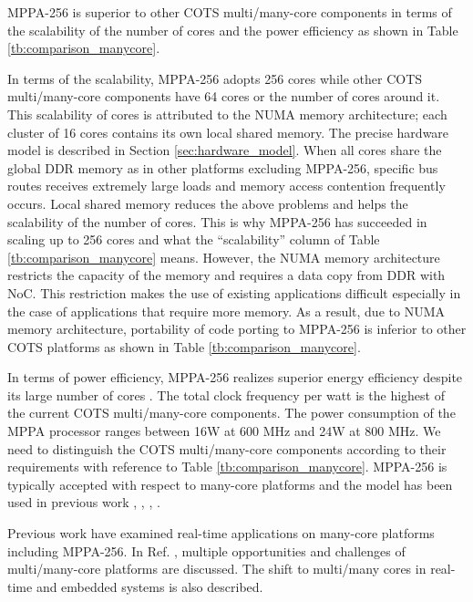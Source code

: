 \documentclass[conference,compsoc]{IEEEtran}
\newcommand{\comment}[1]{}
\begin{document}
\comment{1-27}
MPPA-256 is superior to other COTS multi/many-core components in terms of the scalability of the number of cores and the power efficiency as shown in Table \ref{tb:comparison_manycore}.
\comment{1-28}
In terms of the scalability, MPPA-256 adopts 256 cores while other COTS multi/many-core components have 64 cores or the number of cores around it.
This scalability of cores is attributed to the NUMA memory architecture; each cluster of 16 cores contains its own local shared memory.
The precise hardware model is described in Section \ref{sec:hardware_model}.
When all cores share the global DDR memory as in other platforms excluding MPPA-256, specific bus routes receives extremely large loads and memory access contention frequently occurs.
Local shared memory reduces the above problems and helps the scalability of the number of cores.
This is why MPPA-256 has succeeded in scaling up to 256 cores and what the ``scalability'' column of Table \ref{tb:comparison_manycore} means.
However, the NUMA memory architecture restricts the capacity of the memory and requires a data copy from DDR with NoC.
This restriction makes the use of existing applications difficult especially in the case of applications that require more memory.
As a result, due to  NUMA memory architecture, portability of code porting to MPPA-256 is inferior to other COTS platforms as shown in Table \ref{tb:comparison_manycore}.

In terms of power efficiency, MPPA-256 realizes superior energy efficiency despite its large number of cores \cite{kanter2015kalray}.
The total clock frequency per watt is the highest of the current COTS multi/many-core components.
The power consumption of the MPPA processor ranges between 16W at 600 MHz and 24W at 800 MHz.
We need to distinguish the COTS multi/many-core components according to their requirements with reference to Table \ref{tb:comparison_manycore}.
MPPA-256 is typically accepted with respect to many-core platforms and the model has been used in previous work \cite{becker2016contention}, \cite{carle2014static}, \cite{perret2016mapping}, \cite{perret2016predictable}.

Previous work have examined real-time applications on many-core platforms including MPPA-256.
In Ref. \cite{saidi2015shift}, multiple opportunities and challenges of multi/many-core platforms are discussed.
The shift to multi/many cores in real-time and embedded systems is also described. 
\end{document}
